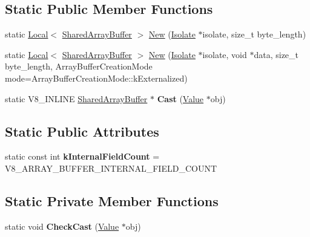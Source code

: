 \subsection*{Static Public Member Functions}
\begin{DoxyCompactItemize}
\item 
static \hyperlink{classv8_1_1_local}{Local}$<$ \hyperlink{classv8_1_1_shared_array_buffer}{Shared\+Array\+Buffer} $>$ \hyperlink{classv8_1_1_shared_array_buffer_a0e7060cc31105c5bf780d770c1a7acc6}{New} (\hyperlink{classv8_1_1_isolate}{Isolate} $\ast$isolate, size\+\_\+t byte\+\_\+length)
\item 
static \hyperlink{classv8_1_1_local}{Local}$<$ \hyperlink{classv8_1_1_shared_array_buffer}{Shared\+Array\+Buffer} $>$ \hyperlink{classv8_1_1_shared_array_buffer_af708b1765380ad42b7d572dfc531c21c}{New} (\hyperlink{classv8_1_1_isolate}{Isolate} $\ast$isolate, void $\ast$data, size\+\_\+t byte\+\_\+length, Array\+Buffer\+Creation\+Mode mode=Array\+Buffer\+Creation\+Mode\+::k\+Externalized)
\item 
static V8\+\_\+\+I\+N\+L\+I\+NE \hyperlink{classv8_1_1_shared_array_buffer}{Shared\+Array\+Buffer} $\ast$ {\bfseries Cast} (\hyperlink{classv8_1_1_value}{Value} $\ast$obj)\hypertarget{classv8_1_1_shared_array_buffer_ac4e1ba5d4564c7033814f4cc45fdda84}{}\label{classv8_1_1_shared_array_buffer_ac4e1ba5d4564c7033814f4cc45fdda84}

\end{DoxyCompactItemize}
\subsection*{Static Public Attributes}
\begin{DoxyCompactItemize}
\item 
static const int {\bfseries k\+Internal\+Field\+Count} = V8\+\_\+\+A\+R\+R\+A\+Y\+\_\+\+B\+U\+F\+F\+E\+R\+\_\+\+I\+N\+T\+E\+R\+N\+A\+L\+\_\+\+F\+I\+E\+L\+D\+\_\+\+C\+O\+U\+NT\hypertarget{classv8_1_1_shared_array_buffer_a6f47f6b441e37aefd1a9d0176e8a3da8}{}\label{classv8_1_1_shared_array_buffer_a6f47f6b441e37aefd1a9d0176e8a3da8}

\end{DoxyCompactItemize}
\subsection*{Static Private Member Functions}
\begin{DoxyCompactItemize}
\item 
static void {\bfseries Check\+Cast} (\hyperlink{classv8_1_1_value}{Value} $\ast$obj)\hypertarget{classv8_1_1_shared_array_buffer_abd9ac57bccf0e1a99b24057332a743d9}{}\label{classv8_1_1_shared_array_buffer_abd9ac57bccf0e1a99b24057332a743d9}

\end{DoxyCompactItemize}


